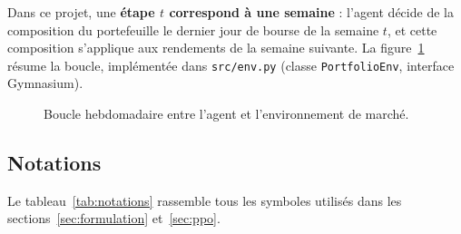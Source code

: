 \documentclass[11pt,a4paper]{article}
\begin{document}
Dans ce projet, une \textbf{étape \(t\) correspond à une semaine} : l'agent décide de la composition du
portefeuille le dernier jour de bourse de la semaine \(t\), et cette composition s'applique aux rendements de la
semaine suivante. La figure~\ref{fig:boucle} résume la boucle, implémentée dans \texttt{src/env.py}
(classe \texttt{PortfolioEnv}, interface Gymnasium).

\begin{figure}[H]
\centering
{}
\caption{Boucle hebdomadaire entre l'agent et l'environnement de marché.}
\label{fig:boucle}
\end{figure}

\subsection{Notations}
Le tableau~\ref{tab:notations} rassemble tous les symboles utilisés dans les sections~\ref{sec:formulation} et~\ref{sec:ppo}.
\end{document}
